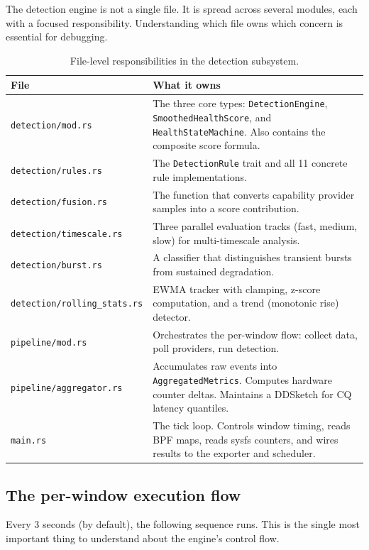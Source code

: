 \documentclass[11pt]{article}
\begin{document}
The detection engine is not a single file. It is spread across several
modules, each with a focused responsibility. Understanding which file owns
which concern is essential for debugging.

\begin{table}[h]
\centering
\small
\begin{tabularx}{\textwidth}{p{4.8cm}X}
\toprule
File & What it owns \\
\midrule
\texttt{detection/mod.rs} & The three core types: \texttt{DetectionEngine}, \texttt{SmoothedHealthScore}, and \texttt{HealthStateMachine}. Also contains the composite score formula. \\[2pt]
\texttt{detection/rules.rs} & The \texttt{DetectionRule} trait and all 11 concrete rule implementations. \\[2pt]
\texttt{detection/fusion.rs} & The function that converts capability provider samples into a score contribution. \\[2pt]
\texttt{detection/timescale.rs} & Three parallel evaluation tracks (fast, medium, slow) for multi-timescale analysis. \\[2pt]
\texttt{detection/burst.rs} & A classifier that distinguishes transient bursts from sustained degradation. \\[2pt]
\texttt{detection/rolling\_stats.rs} & EWMA tracker with clamping, z-score computation, and a trend (monotonic rise) detector. \\[2pt]
\texttt{pipeline/mod.rs} & Orchestrates the per-window flow: collect data, poll providers, run detection. \\[2pt]
\texttt{pipeline/aggregator.rs} & Accumulates raw events into \texttt{AggregatedMetrics}. Computes hardware counter deltas. Maintains a DDSketch for CQ latency quantiles. \\[2pt]
\texttt{main.rs} & The tick loop. Controls window timing, reads BPF maps, reads sysfs counters, and wires results to the exporter and scheduler. \\
\bottomrule
\end{tabularx}
\caption{File-level responsibilities in the detection subsystem.}
\label{tab:files}
\end{table}

\subsection{The per-window execution flow}

Every 3 seconds (by default), the following sequence runs. This is the single
most important thing to understand about the engine's control flow.
\end{document}
